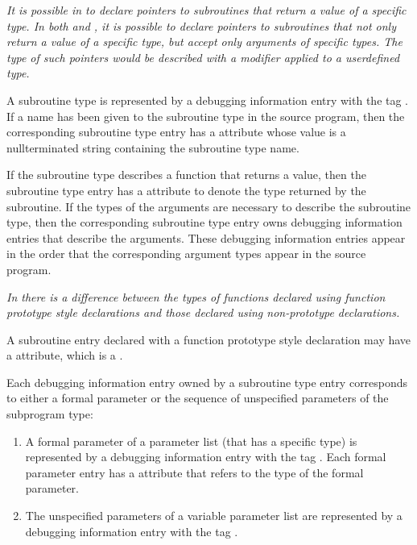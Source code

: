 \textit{It is possible in 
to declare pointers to subroutines
that return a value of a specific type. In both 
 and ,
it is possible to declare pointers to subroutines that not
only return a value of a specific type, but accept only
arguments of specific types. The type of such pointers would
be described with a  modifier applied to a
user\dash defined type.}

A subroutine type is represented by a debugging information
entry with the 
tag \DWTAGsubroutinetypeTARG. 
If a name has
been given to the subroutine type in the source program,
then the corresponding subroutine type entry has 
a \DWATname{} attribute 
whose value is a null\dash terminated string containing
the subroutine type name.
\bbeb

If the subroutine type describes a function that returns
a value, then the subroutine type entry has a
\DWATtype{}
attribute to denote the type returned by the subroutine. If
the types of the arguments are necessary to describe the
subroutine type, then the corresponding subroutine type
entry owns debugging information entries that describe the
arguments. These debugging information entries appear in the
order that the corresponding argument types appear in the
source program.

\textit{In  there 
is a difference between the types of functions
declared using function prototype style declarations and
those declared using non-prototype declarations.}

A 
\hypertarget{chap:DWATprototypedsubroutineprototype}{}
subroutine entry declared with a function prototype style
declaration may have 
a 
\DWATprototypedDEFN{} attribute, which is
a .

Each debugging information entry owned by a subroutine
type entry corresponds to either a formal parameter or the sequence of
unspecified parameters of the subprogram type:

\begin{enumerate}[1. ]
\item A formal parameter of a parameter list (that has a
specific type) is represented by a debugging information entry
with the tag \DWTAGformalparameter. 
Each formal parameter
entry has 
a \DWATtype{} attribute that refers to the type of
the formal parameter.

\item The unspecified parameters of a variable parameter list
are 
represented by a debugging information entry with the
tag \DWTAGunspecifiedparameters.
\end{enumerate}

